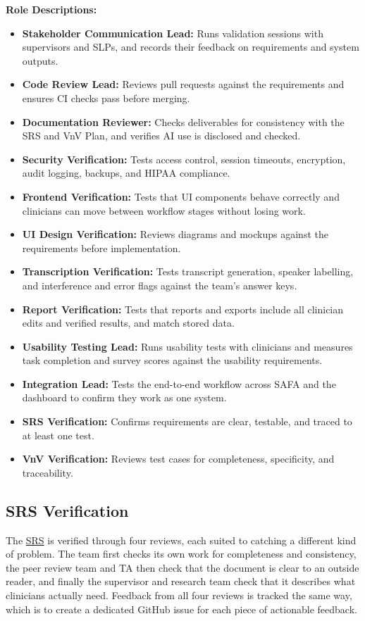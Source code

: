 \documentclass[12pt, titlepage]{article}
\newcommand{\SRSLink}{\href{https://github.com/Nour-Fawaz/MacaBoca/blob/main/pdfs/SRS/SRS.pdf}{SRS}}
\renewcommand{\_}{\oldunderscore\allowbreak}
\begin{document}
\noindent\textbf{Role Descriptions:}
\begin{itemize}
  \item \textbf{Stakeholder Communication Lead:} Runs validation sessions with supervisors and SLPs, and records their feedback on requirements and system outputs.
  \item \textbf{Code Review Lead:} Reviews pull requests against the requirements and ensures CI checks pass before merging.
  \item \textbf{Documentation Reviewer:} Checks deliverables for consistency with the SRS and VnV Plan, and verifies AI use is disclosed and checked.
  \item \textbf{Security Verification:} Tests access control, session timeouts, encryption, audit logging, backups, and HIPAA compliance.
  \item \textbf{Frontend Verification:} Tests that UI components behave correctly and clinicians can move between workflow stages without losing work.
  \item \textbf{UI Design Verification:} Reviews diagrams and mockups against the requirements before implementation.
  \item \textbf{Transcription Verification:} Tests transcript generation, speaker labelling, and interference and error flags against the team's answer keys.
  \item \textbf{Report Verification:} Tests that reports and exports include all clinician edits and verified results, and match stored data.
  \item \textbf{Usability Testing Lead:} Runs usability tests with clinicians and measures task completion and survey scores against the usability requirements.
  \item \textbf{Integration Lead:} Tests the end-to-end workflow across SAFA and the dashboard to confirm they work as one system.
  \item \textbf{SRS Verification:} Confirms requirements are clear, testable, and traced to at least one test.
  \item \textbf{VnV Verification:} Reviews test cases for completeness, specificity, and traceability.
\end{itemize}

\subsection{SRS Verification} \label{sec:SRSVerification}

The \SRSLink{} is verified through four reviews, each suited to catching a different kind of problem. 
The team first checks its own work for completeness and consistency, the peer review team and TA then check that the document is clear to an outside reader, and finally the supervisor and research team check that it describes what clinicians actually need. 
Feedback from all four reviews is tracked the same way, which is to create a dedicated GitHub issue for each piece of actionable feedback.
\end{document}
